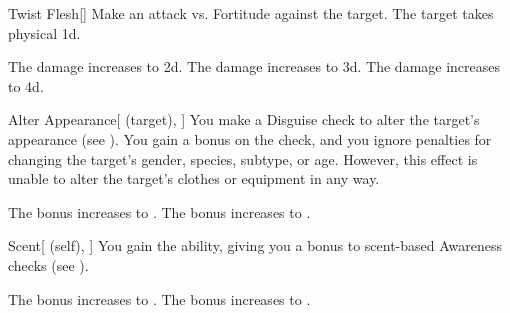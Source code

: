 \lowercase{\hypertarget{spell:Twist Flesh}{}}\label{spell:Twist Flesh}
\begin{freeability}[Rank 1]{\hypertarget{spell:Twist Flesh}{Twist Flesh}}[]
Make an attack vs. Fortitude against the target.
\hit The target takes physical  \plus1d.

\rankline
{} The damage increases to  \plus2d.
 The damage increases to  \plus3d.
 The damage increases to  \plus4d.
\end{freeability}
\vspace{0.25em}



\lowercase{\hypertarget{spell:Alter Appearance}{}}\label{spell:Alter Appearance}
\begin{attuneability}[Rank 3]{\hypertarget{spell:Alter Appearance}{Alter Appearance}}[ (target), ]
You make a Disguise check to alter the target's appearance (see ).
You gain a  bonus on the check, and you ignore penalties for changing the target's gender, species, subtype, or age.
However, this effect is unable to alter the target's clothes or equipment in any way.

\rankline
{} The bonus increases to .
 The bonus increases to .
\end{attuneability}
\vspace{0.25em}



\lowercase{\hypertarget{spell:Scent}{}}\label{spell:Scent}
\begin{attuneability}[Rank 3]{\hypertarget{spell:Scent}{Scent}}[ (self), ]
You gain the  ability, giving you a  bonus to scent-based Awareness checks (see ).

\rankline
{} The bonus increases to .
 The bonus increases to .
\end{attuneability}
\vspace{0.25em}



